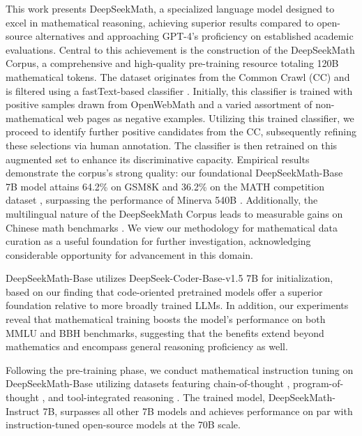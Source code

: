 This work presents DeepSeekMath, a specialized language model designed to excel in mathematical reasoning, achieving superior results compared to open-source alternatives and approaching GPT-4’s proficiency on established academic evaluations. Central to this achievement is the construction of the DeepSeekMath Corpus, a comprehensive and high-quality pre-training resource totaling 120B mathematical tokens. The dataset originates from the Common Crawl (CC) and is filtered using a fastText-based classifier \citep{joulin2016fasttext}. Initially, this classifier is trained with positive samples drawn from OpenWebMath \citep{openwebmath} and a varied assortment of non-mathematical web pages as negative examples. Utilizing this trained classifier, we proceed to identify further positive candidates from the CC, subsequently refining these selections via human annotation. The classifier is then retrained on this augmented set to enhance its discriminative capacity. Empirical results demonstrate the corpus’s strong quality: our foundational DeepSeekMath-Base 7B model attains 64.2\% on GSM8K \citep{gsm8k} and 36.2\% on the MATH competition dataset \citep{MATH}, surpassing the performance of Minerva 540B \citep{minerva}. Additionally, the multilingual nature of the DeepSeekMath Corpus leads to measurable gains on Chinese math benchmarks \citep{wei2023cmath,agieval}. We view our methodology for mathematical data curation as a useful foundation for further investigation, acknowledging considerable opportunity for advancement in this domain.

DeepSeekMath-Base utilizes DeepSeek-Coder-Base-v1.5 7B \citep{deepseek-coder} for initialization, based on our finding that code-oriented pretrained models offer a superior foundation relative to more broadly trained LLMs. In addition, our experiments reveal that mathematical training boosts the model’s performance on both MMLU \citep{mmlu} and BBH \citep{bbh} benchmarks, suggesting that the benefits extend beyond mathematics and encompass general reasoning proficiency as well.

Following the pre-training phase, we conduct mathematical instruction tuning on DeepSeekMath-Base utilizing datasets featuring chain-of-thought \citep{cot}, program-of-thought \citep{pot,pal}, and tool-integrated reasoning \citep{tora}. The trained model, DeepSeekMath-Instruct 7B, surpasses all other 7B models and achieves performance on par with instruction-tuned open-source models at the 70B scale.

